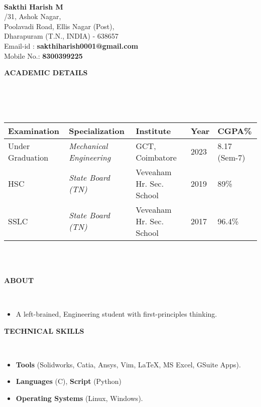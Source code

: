 \documentclass[a4paper,10pt]{article}
\newcommand{\lsep}{-0.5cm}
\newcommand{\resheading}[1]{{\small \colorbox{mygrey}{\begin{minipage}{0.975\textwidth}{\textbf{#1 \vphantom{p\^{E}}}}\end{minipage}}}}
\begin{document}
\hspace{0.5cm}\\[-0.2cm]

\textbf{Sakthi Harish M} \\
/31, Ashok Nagar, \\
\indent Poolavadi Road, Ellis Nagar (Post), \\
\indent Dharapuram (T.N., INDIA) - 638657\\
\indent Email-id : \textbf{sakthiharish0001@gmail.com} \\
\indent Mobile No.: \textbf{8300399225} \\

\resheading{\textbf{ACADEMIC DETAILS} }\\[\lsep]
\\ \\
\indent \begin{tabular}{ l @{\hskip 0.15in} l @{\hskip 0.15in} l @{\hskip 0.15in} l @{\hskip 0.15in} l }
\hline
\textbf{Examination} & \textbf{Specialization} & \textbf{Institute} & \textbf{Year} & \textbf{CGPA\%} \\
\hline
Under Graduation & \textit{Mechanical Engineering} & GCT, Coimbatore & 2023 & 8.17 (Sem-7)\\
HSC & \textit{State Board (TN)} & Veveaham Hr. Sec. School & 2019 & 89\% \\
SSLC & \textit{State Board (TN)} & Veveaham Hr. Sec. School & 2017 & 96.4\% \\
\hline
\end{tabular}
\\ \\

\resheading{\textbf{ABOUT} }\\[\lsep]
\begin{itemize}
\item \noindent A left-brained, Engineering student with first-principles thinking.
\end{itemize}

\resheading{\textbf{TECHNICAL SKILLS} }\\[\lsep]
\begin{itemize}
\item \noindent \textbf{Tools} (Solidworks, Catia, Ansys, Vim, \LaTeX, MS Excel, GSuite Apps).
\item \noindent \textbf{Languages} (C), \textbf{Script} (Python)
\item \noindent \textbf{Operating Systems} (Linux, Windows).
\end{itemize}
\end{document}

